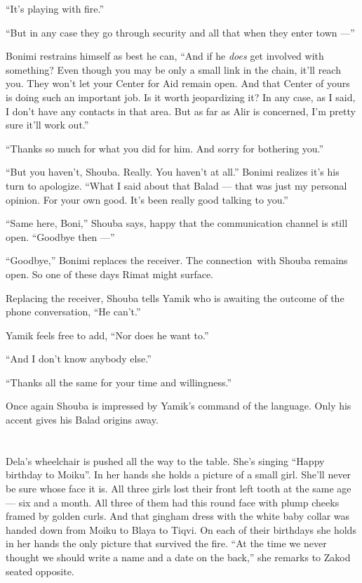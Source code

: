 \documentclass[twoside,11pt]{book}
\begin{document}
``It's playing with fire.''

``But in any case they go through security and all that when they enter town ---''

Bonimi restrains himself as best he can, ``And if he \textit{does} get involved with something? Even though
you may be only a small link in the chain, it'll reach you. They won't let your Center for Aid remain open. And that
Center of yours is doing such an important job. Is it worth jeopardizing it? In any case, as I said, I don't have any
contacts in that area. But as far as Alir is concerned, I'm pretty sure it'll work out.''

``Thanks so much for what you did for him. And sorry for bothering you.''

``But you haven't, Shouba.  Really. You haven't at all.'' Bonimi realizes it's his turn to
apologize. ``What I said about that Balad --- that was just my personal opinion. For your own good. It's
been really good{ }talking to you.''

``Same here, Boni,'' Shouba says, happy that the communication channel is still open.
``Goodbye then ---''

``Goodbye,'' Bonimi replaces the receiver. The connection~with Shouba remains open. So one of
these days Rimat might surface.

Replacing the receiver, Shouba tells Yamik who is awaiting the outcome of the phone conversation, ``He
can't.''

Yamik feels free to add, ``Nor does he want to.''

``And I don't know anybody else.''

``Thanks all the same for your time and willingness.''

Once again Shouba is impressed by Yamik's command of the language.  Only his accent gives his Balad origins away.



\chapter{}

Dela's wheelchair is pushed all the way to the table. She's singing ``Happy birthday to
Moiku''. In her hands she holds a picture of a small girl. She'll never be sure whose face it is. All
three girls lost their front left tooth at the same age --- six and a month. All three of them had this round face with
plump cheeks framed by golden curls. And that gingham dress with the white baby collar was handed down from Moiku to
Blaya to Tiqvi. On each of their birthdays she holds in her hands the only picture that survived the
fire. ``At the time we never thought we should write a name and a date on the back,'' she
remarks to Zakod seated opposite.
\end{document}
